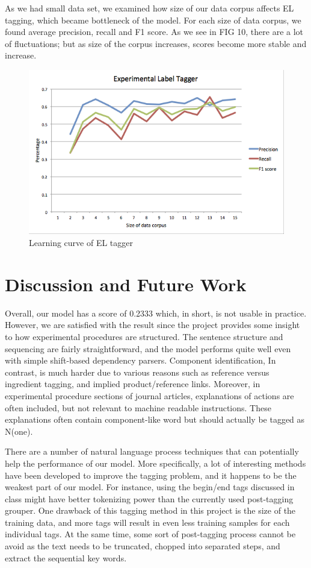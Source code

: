 As we had small data set, we examined how size of our data corpus affects EL tagging, which became bottleneck of the model. For each size of data corpus, we found average precision, recall and F1 score. As we see in FIG 10, there are a lot of fluctuations; but as size of the corpus increases, scores become more stable and increase. 
\begin{figure}
  \centering
    \includegraphics[width=.5\textwidth]{ELtagger.png}
  \caption{Learning curve of EL tagger}
\end{figure}

\section{Discussion and Future Work}

Overall, our model has a score of 0.2333 which, in short, is not usable in practice. However, we are satisfied with the result since the project provides some insight to how experimental procedures are structured. The sentence structure and sequencing are fairly straightforward, and the model performs quite well even with simple shift-based dependency parsers. Component identification, In contrast, is much harder due to various reasons such as reference versus ingredient tagging, and implied product/reference links. Moreover, in experimental procedure sections of journal articles, explanations of actions are often included, but not relevant to machine readable instructions. These explanations often contain component-like word but should actually be tagged as N(one). 

There are a number of natural language process techniques that can potentially help the performance of our model. More specifically, a lot of interesting methods have been developed to improve the tagging problem, and it happens to be the weakest part of our model. For instance, using the begin/end tags discussed in class might have better tokenizing power than the currently used post-tagging grouper. One drawback of this tagging method in this project is the size of the training data, and more tags will result in even less training samples for each individual tags. At the same time, some sort of post-tagging process cannot be avoid as the text needs to be truncated, chopped into separated steps, and extract the sequential key words. 

